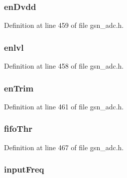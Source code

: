 \hypertarget{a00023_ac7b39aee6c3743b4051577764b29a1c6}{
\subsubsection[{enDvdd}]{ {\bf enDvdd}}}
\label{a00023_ac7b39aee6c3743b4051577764b29a1c6}


Definition at line 459 of file gsn\_\-adc.h.

\hypertarget{a00023_a0864e408c6d88b47673b06c8049431c2}{
\subsubsection[{enlvl}]{ {\bf enlvl}}}
\label{a00023_a0864e408c6d88b47673b06c8049431c2}


Definition at line 458 of file gsn\_\-adc.h.

\hypertarget{a00023_ad3101adef29a907da1ad8cbf7f5921a4}{
\subsubsection[{enTrim}]{ {\bf enTrim}}}
\label{a00023_ad3101adef29a907da1ad8cbf7f5921a4}


Definition at line 461 of file gsn\_\-adc.h.

\hypertarget{a00023_abcb04a8b2727d552feab58429746beae}{
\subsubsection[{fifoThr}]{ {\bf fifoThr}}}
\label{a00023_abcb04a8b2727d552feab58429746beae}


Definition at line 467 of file gsn\_\-adc.h.

\hypertarget{a00023_adf21af1b4c3574ceee0672561eecb346}{
\subsubsection[{inputFreq}]{ {\bf inputFreq}}}
\label{a00023_adf21af1b4c3574ceee0672561eecb346}


